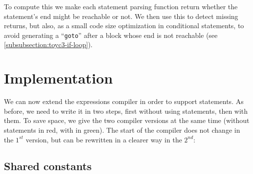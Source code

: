 To compute this we make each statement parsing function return whether the
statement's end might be reachable or not. We then use this to detect missing
returns, but also, as a small code size optimization in conditional statements,
to avoid generating a ``{\tt goto}'' after a block whose end is not reachable
(see \cref{subsubsection:toyc3-if-loop}).

\section{Implementation}


We can now extend the expressions compiler in order to support statements. As
before, we need to write it in two steps, first without using statements, then
with them. To save space, we give the two compiler versions at the same time
(without statements in red, with in green). The start of the compiler does not
change in the $1^{st}$ version, but can be rewritten in a clearer way in the
$2^{nd}$:


\subsection{Shared constants}

